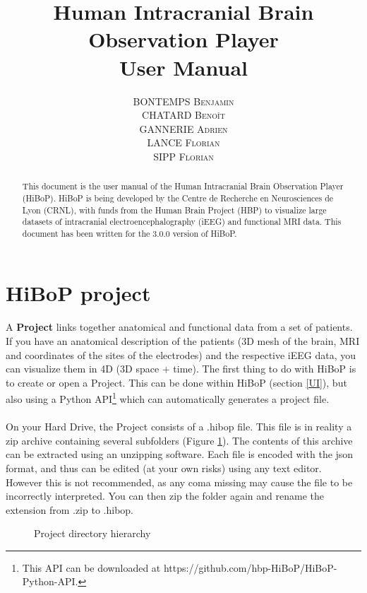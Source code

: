 \documentclass[a4paper]{article}
\title{Human Intracranial Brain Observation Player \\ User Manual}
\author{\textsc{BONTEMPS Benjamin} \\ \textsc{CHATARD Benoît} \\ \textsc{GANNERIE Adrien} \\ \textsc{LANCE Florian} \\ \textsc{SIPP Florian}}
\begin{document}
\maketitle
\begin{abstract}
This document is the user manual of the Human Intracranial Brain Observation Player (HiBoP). HiBoP is being developed by the Centre de Recherche en Neurosciences de Lyon (CRNL), with funds from the Human Brain Project (HBP) to visualize large datasets of intracranial electroencephalography (iEEG) and functional MRI data. This document has been written for the 3.0.0 version of HiBoP.
\end{abstract}
\tableofcontents
\section{HiBoP project} \label{data}
\paragraph{} A \textbf{Project} links together anatomical and functional data from a set of patients. If you have an anatomical description of the patients (3D mesh of the brain, MRI and coordinates of the sites of the electrodes) and the respective iEEG data, you can visualize them in 4D (3D space + time). The first thing to do with HiBoP is to create or open a Project. This can be done within HiBoP (section \ref{UI}), but also using a Python API\footnote{This API can be downloaded at https://github.com/hbp-HiBoP/HiBoP-Python-API.} which can automatically generates a project file.
\paragraph{} On your Hard Drive, the Project consists of a .hibop file. This file is in reality a zip archive containing several subfolders (Figure \ref{projectDirectory}). The contents of this archive can be extracted using an unzipping software. Each file is encoded with the json format, and thus can be edited (at your own risks) using any text editor. However this is not recommended, as any coma missing may cause the file to be incorrectly interpreted. You can then zip the folder again and rename the extension from .zip to .hibop.
\begin{figure}[H]
\caption{\label{projectDirectory}Project directory hierarchy}
\end{figure}
\end{document}
